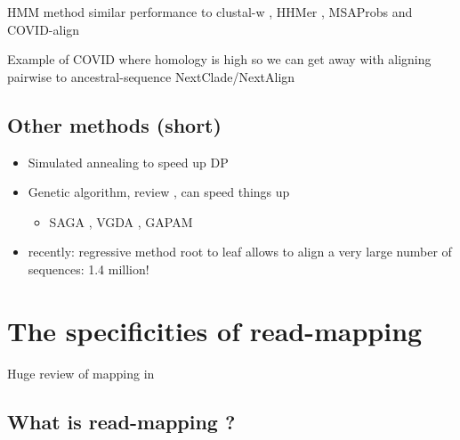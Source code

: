 \documentclass[
  11pt,
  twoside]{scrbook}
\providecommand{\tightlist}{%
  \setlength{\itemsep}{0pt}\setlength{\parskip}{0pt}}
\begin{document}
HMM method similar performance to clustal-w \autocite{eddyMultipleAlignmentUsing}, HHMer \autocite{finnHMMERWebServer2011}, MSAProbs \autocite{liuMSAProbsMultipleSequence2010} and COVID-align \autocite{lemoineCOVIDAlignAccurateOnline2020}

Example of COVID where homology is high so we can get away with aligning pairwise to ancestral-sequence NextClade/NextAlign \autocite{aksamentovNextcladeCladeAssignment2021}

\hypertarget{other-methods-short}{%
\subsection{Other methods (short)}\label{other-methods-short}}

\begin{itemize}
\item
  Simulated annealing to speed up DP \autocite{kimMultipleSequenceAlignment1994,ishikawaMultipleSequenceAlignment1993,huoSimulatedAnnealingAlgorithm2007}
\item
  Genetic algorithm, review \autocite{chowdhuryReviewMultipleSequence2017}, can speed things up \autocite{zhangGeneticAlgorithmMultiple1997}

  \begin{itemize}
  \tightlist
  \item
    SAGA \autocite{notredameSAGASequenceAlignment1996}, VGDA \autocite{nazninVerticalDecompositionGenetic2011}, GAPAM \autocite{nazninProgressiveAlignmentMethod2012}
  \end{itemize}
\item
  recently: regressive method \autocite{garrigaLargeMultipleSequence2019} root to leaf allows to align a very large number of sequences: 1.4 million!
\end{itemize}

\hypertarget{the-specificities-of-read-mapping}{%
\section{The specificities of read-mapping}\label{the-specificities-of-read-mapping}}

Huge review of mapping in \autocite{alserTechnologyDictatesAlgorithms2021}

\hypertarget{what-is-read-mapping}{%
\subsection{What is read-mapping ?}\label{what-is-read-mapping}}
\end{document}
